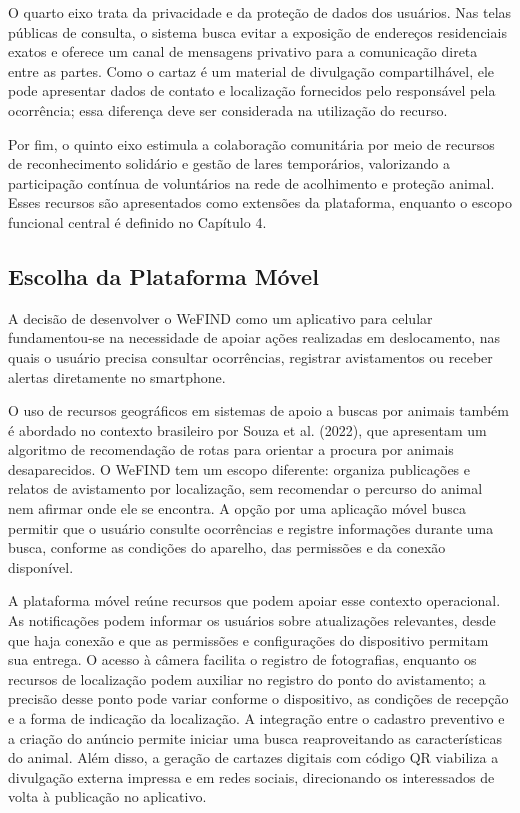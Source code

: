 O quarto eixo trata da privacidade e da proteção de dados dos usuários. Nas telas públicas de consulta, o sistema busca evitar a exposição de endereços residenciais exatos e oferece um canal de mensagens privativo para a comunicação direta entre as partes. Como o cartaz é um material de divulgação compartilhável, ele pode apresentar dados de contato e localização fornecidos pelo responsável pela ocorrência; essa diferença deve ser considerada na utilização do recurso.

Por fim, o quinto eixo estimula a colaboração comunitária por meio de recursos de reconhecimento solidário e gestão de lares temporários, valorizando a participação contínua de voluntários na rede de acolhimento e proteção animal. Esses recursos são apresentados como extensões da plataforma, enquanto o escopo funcional central é definido no Capítulo 4.


\subsection{Escolha da Plataforma Móvel}

A decisão de desenvolver o WeFIND como um aplicativo para celular fundamentou-se na necessidade de apoiar ações realizadas em deslocamento, nas quais o usuário precisa consultar ocorrências, registrar avistamentos ou receber alertas diretamente no smartphone.

O uso de recursos geográficos em sistemas de apoio a buscas por animais também é abordado no contexto brasileiro por Souza et al. (2022), que apresentam um algoritmo de recomendação de rotas para orientar a procura por animais desaparecidos. O WeFIND tem um escopo diferente: organiza publicações e relatos de avistamento por localização, sem recomendar o percurso do animal nem afirmar onde ele se encontra. A opção por uma aplicação móvel busca permitir que o usuário consulte ocorrências e registre informações durante uma busca, conforme as condições do aparelho, das permissões e da conexão disponível.

A plataforma móvel reúne recursos que podem apoiar esse contexto operacional. As notificações podem informar os usuários sobre atualizações relevantes, desde que haja conexão e que as permissões e configurações do dispositivo permitam sua entrega. O acesso à câmera facilita o registro de fotografias, enquanto os recursos de localização podem auxiliar no registro do ponto do avistamento; a precisão desse ponto pode variar conforme o dispositivo, as condições de recepção e a forma de indicação da localização. A integração entre o cadastro preventivo e a criação do anúncio permite iniciar uma busca reaproveitando as características do animal. Além disso, a geração de cartazes digitais com código QR viabiliza a divulgação externa impressa e em redes sociais, direcionando os interessados de volta à publicação no aplicativo.



